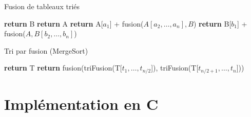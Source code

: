 \documentclass[10pt,xcolor=dvipsnames]{beamer}
\begin{document}
 
 \begin{frame}{Fusion de tableaux triés}
            \begin{tcolorbox}
  \begin{algorithmic}[1]
            \State \textbf{return} B
        \EndIf
            \State \textbf{return} A
        \EndIf
            \State \textbf{return} A[$a_1$] + fusion($A[a_2,\ldots,a_n],B$)
        \Else
            \State \textbf{return} B[$b_1$] + fusion($A, B[b_2,\ldots,b_n]$)   
        \EndIf
    \EndFunction
  \end{algorithmic}
\end{tcolorbox}


     
 \end{frame}

\begin{frame}{Tri par fusion (MergeSort)}
                \begin{tcolorbox}
  \begin{algorithmic}[1]
            \State \textbf{return} T
        \Else
            \State \textbf{return} fusion(triFusion(T[$t_1, \ldots, t_{n/2}$]), triFusion(T[$t_{n/2 + 1}, \ldots, t_n$]))
        \EndIf
    \EndFunction
  \end{algorithmic}
\end{tcolorbox}

\end{frame}



\section{Implémentation en C}
\end{document}
